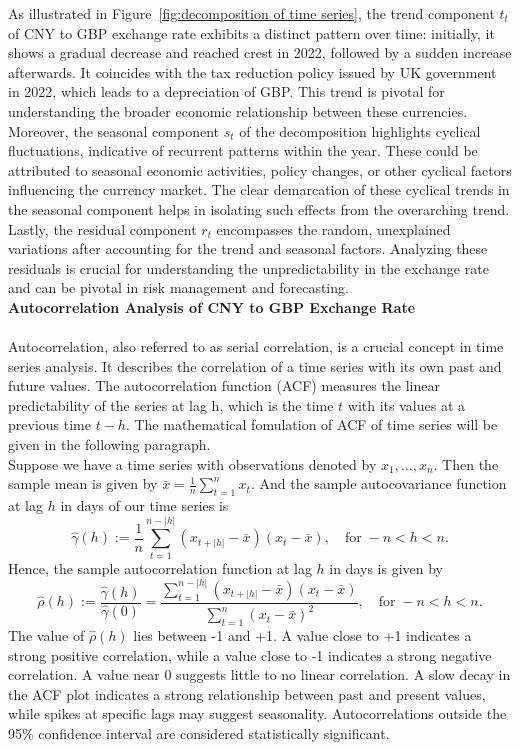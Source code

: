 \documentclass{article}\usepackage[]{graphicx}\usepackage[]{xcolor}
\begin{document}
\noindent
As illustrated in Figure~\ref{fig:decomposition of time series}, the trend component $t_t$ of CNY to GBP exchange rate exhibits a distinct pattern over time: initially, it shows a gradual decrease and reached crest in 2022, followed by a sudden increase afterwards. It coincides with the tax reduction policy issued by UK government in 2022, which leads to a depreciation of GBP. This trend is pivotal for understanding the broader economic relationship between these currencies. \\

\noindent
Moreover, the seasonal component $s_t$ of the decomposition highlights cyclical fluctuations, indicative of recurrent patterns within the year. These could be attributed to seasonal economic activities, policy changes, or other cyclical factors influencing the currency market. The clear demarcation of these cyclical trends in the seasonal component helps in isolating such effects from the overarching trend.\\

\noindent
Lastly, the residual component $r_t$ encompasses the random, unexplained variations after accounting for the trend and seasonal factors. Analyzing these residuals is crucial for understanding the unpredictability in the exchange rate and can be pivotal in risk management and forecasting.\\

\noindent
\textbf{Autocorrelation Analysis of CNY to GBP Exchange Rate}\\\\
Autocorrelation, also referred to as serial correlation, is a crucial concept in time series analysis. It describes the correlation of a time series with its own past and future values. The autocorrelation function (ACF) measures the linear predictability of the series at lag h, which is the time $t$ with its values at a previous time $t-h$. The mathematical fomulation of ACF of time series will be given in the following paragraph.\\

\noindent
Suppose we have a time series with observations denoted by \( x_1, \ldots, x_n \). Then the sample mean is given by $\bar{x} = \frac{1}{n} \sum_{t=1}^{n} x_t.$
And the sample autocovariance function at lag $h$ in days of our time series is
\[\hat{\gamma}(h) := \frac{1}{n} \sum_{t=1}^{n-|h|} (x_{t+|h|} - \bar{x})(x_t - \bar{x}), \quad \text{for} \; -n < h < n.\]
Hence, the sample autocorrelation function at lag $h$ in days is given by
\[\hat{\rho}(h) := \frac{\hat{\gamma}(h)}{\hat{\gamma}(0)} = \frac{\sum_{t=1}^{n-|h|} (x_{t+|h|} - \bar{x})(x_t - \bar{x})}{\sum_{t=1}^{n} (x_t - \bar{x})^{2}}, \quad \text{for} \; -n < h < n.\]
\noindent
The value of $\hat{\rho}(h)$ lies between -1 and +1. A value close to +1 indicates a strong positive correlation, while a value close to -1 indicates a strong negative correlation. A value near 0 suggests little to no linear correlation. A slow decay in the ACF plot indicates a strong relationship between past and present values, while spikes at specific lags may suggest seasonality. Autocorrelations outside the 95\% confidence interval are considered statistically significant.\\
\end{document}
